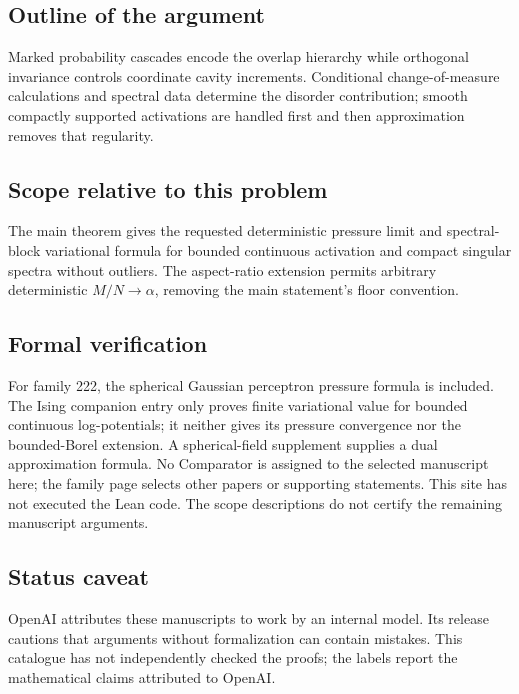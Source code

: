 \documentclass[11pt]{article}
\begin{document}
\subsection{Outline of the argument}
Marked probability cascades encode the overlap hierarchy while orthogonal invariance controls coordinate cavity increments. Conditional change-of-measure calculations and spectral data determine the disorder contribution; smooth compactly supported activations are handled first and then approximation removes that regularity.

\subsection{Scope relative to this problem}
The main theorem gives the requested deterministic pressure limit and spectral-block variational formula for bounded continuous activation and compact singular spectra without outliers. The aspect-ratio extension permits arbitrary deterministic $M/N\to\alpha$, removing the main statement's floor convention.

\subsection{Formal verification}
For family 222, the spherical Gaussian perceptron pressure formula is included. The Ising companion entry only proves finite variational value for bounded continuous log-potentials; it neither gives its pressure convergence nor the bounded-Borel extension. A spherical-field supplement supplies a dual approximation formula. No Comparator is assigned to the selected manuscript here; the family page selects other papers or supporting statements. This site has not executed the Lean code. The scope descriptions do not certify the remaining manuscript arguments.

\subsection{Status caveat}
OpenAI attributes these manuscripts to work by an internal model. Its release cautions that arguments without formalization can contain mistakes. This catalogue has not independently checked the proofs; the labels report the mathematical claims attributed to OpenAI.
\end{document}
